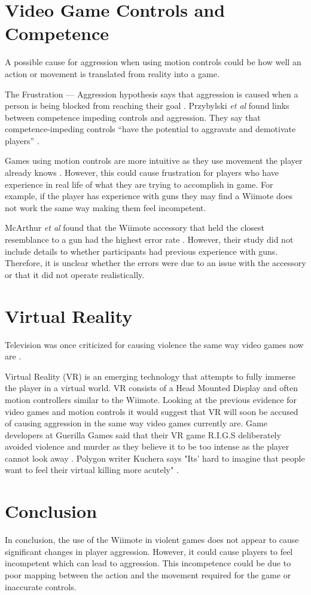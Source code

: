 \documentclass{scrartcl}
\begin{document}
\section{Video Game Controls and Competence}
A possible cause for aggression when using motion controls could be how well an action or movement is translated from reality into a game.  

The Frustration --- Aggression hypothesis says that aggression is caused when a person is being blocked from reaching their goal \cite{dollard1939frustration}.  Przybylski \textit{et al} found links between competence impeding controls and aggression. They say that competence-impeding controls ``have the potential to aggravate and demotivate players” \cite{przybylski}.

Games using motion controls are more intuitive as they use movement the player already knows \cite{Kim}.   However, this could cause frustration for players who have experience in real life of what they are trying to accomplish in game.  For example, if the player has experience with guns they may find a Wiimote does not work the same way making them feel incompetent.
\bigskip

McArthur \textit{et al} found that the Wiimote accessory that held the closest resemblance to a gun had the highest error rate \cite{McArthur}.  However, their study did not include details to whether participants had previous experience with guns. Therefore, it is unclear whether the errors were due to an issue with the accessory or that it did not operate realistically.

 
\section{Virtual Reality}
Television was once criticized for causing violence the same way video games now are \cite{sherry2001effects}. 

Virtual Reality (VR) is an emerging technology that attempts to fully immerse the player in a virtual world.   VR consists of a Head Mounted Display and often motion controllers similar to the Wiimote. 
Looking at the previous evidence for video games and motion controls it would suggest that VR will soon be accused of causing aggression in the same way video games currently are. 
Game developers at Guerilla Games said that their VR game R.I.G.S deliberately avoided violence and murder as they believe it to be too intense as the player cannot look away \cite{VRViolence}. 
Polygon writer Kuchera says "Its' hard to imagine that people want to feel their virtual killing more acutely" \cite{PolygonVR}.  

\section{Conclusion}
In conclusion, the use of the Wiimote in violent games does not appear to cause significant changes in player aggression. However, it could cause players to feel incompetent which can lead to aggression. This incompetence could be due to poor mapping between the action and the movement required for the game or inaccurate controls. 
	


	
\end{document}
